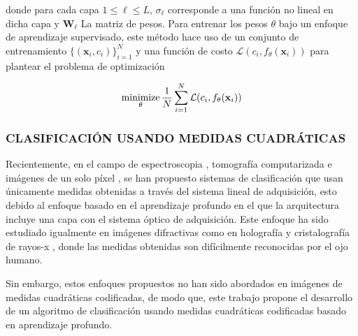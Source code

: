 donde para cada capa $1 \leq \ell \leq L$, $\sigma_\ell$ corresponde a una función no lineal en dicha capa y $\mathbf{W}_\ell$ La matriz de pesos. Para entrenar los pesos $\theta$ bajo un enfoque de aprendizaje supervisado, este método hace uso de un conjunto de entrenamiento $\{(\mathbf{x}_i, c_i) \}_{i=1}^{N}$ y una función de costo $\mathcal{L}( c_i,  f_\theta(\mathbf{x}_i))$ para plantear el problema de optimización 

\begin{equation}
    \operatorname*{minimize}_\theta \frac{1}{N}\sum_{i=1}^{N} \mathcal{L}( c_i,  f_\theta(\mathbf{x}_i))
    \label{eq:optimización_nn}
\end{equation}

\subsubsection{CLASIFICACIÓN USANDO MEDIDAS CUADRÁTICAS}
Recientemente, en el campo de espectroscopia \cite{bacca2021deep}, tomografía computarizada \cite{douarre2020value} e imágenes de un solo píxel \cite{bacca2020coupled}, se han propuesto sistemas de clasificación que usan únicamente medidas obtenidas a través del sistema lineal de adquisición, esto debido al enfoque basado en el aprendizaje profundo en el que la arquitectura incluye una capa con el sistema óptico de adquisición. Este enfoque ha sido estudiado igualmente en imágenes difractivas como en holografía \cite{kim2018deep} y cristalografía de rayos-x \cite{ziletti2018insightful}, donde las medidas obtenidas son difícilmente reconocidas por el ojo humano. 

Sin embargo, estos enfoques propuestos no han sido abordados en imágenes de medidas cuadráticas codificadas, de modo que, este trabajo propone el desarrollo de un algoritmo de clasificación usando medidas cuadráticas codificadas basado en aprendizaje profundo. 


\pagebreak